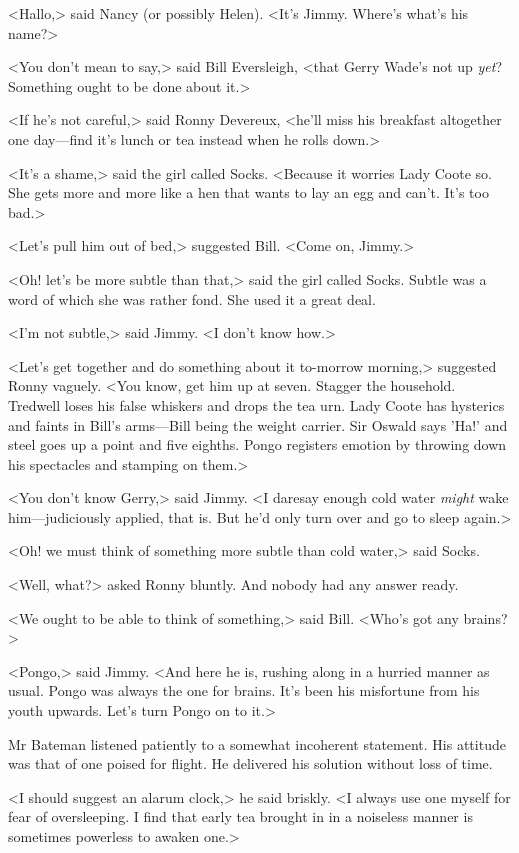<Hallo,> said Nancy (or possibly Helen). <It's Jimmy. Where's what's his name?>

<You don't mean to say,> said Bill Eversleigh, <that Gerry Wade's not up \emph{yet}? Something ought to be done about it.>

<If he's not careful,> said Ronny Devereux, <he'll miss his breakfast altogether one day—find it's lunch or tea instead when he rolls down.>

<It's a shame,> said the girl called Socks. <Because it worries Lady Coote so. She gets more and more like a hen that wants to lay an egg and can't. It's too bad.>

<Let's pull him out of bed,> suggested Bill. <Come on, Jimmy.>

<Oh! let's be more subtle than that,> said the girl called Socks. Subtle was a word of which she was rather fond. She used it a great deal.

<I'm not subtle,> said Jimmy. <I don't know how.>

<Let's get together and do something about it to-morrow morning,> suggested Ronny vaguely. <You know, get him up at seven. Stagger the household. Tredwell loses his false whiskers and drops the tea urn. Lady Coote has hysterics and faints in Bill's arms—Bill being the weight carrier. Sir Oswald says 'Ha!' and steel goes up a point and five eighths. Pongo registers emotion by throwing down his spectacles and stamping on them.>

<You don't know Gerry,> said Jimmy. <I daresay enough cold water \emph{might} wake him—judiciously applied, that is. But he'd only turn over and go to sleep again.>

<Oh! we must think of something more subtle than cold water,> said Socks.

<Well, what?> asked Ronny bluntly. And nobody had any answer ready.

<We ought to be able to think of something,> said Bill. <Who's got any brains?>

<Pongo,> said Jimmy. <And here he is, rushing along in a hurried manner as usual. Pongo was always the one for brains. It's been his misfortune from his youth upwards. Let's turn Pongo on to it.>

Mr Bateman listened patiently to a somewhat incoherent statement. His attitude was that of one poised for flight. He delivered his solution without loss of time.

<I should suggest an alarum clock,> he said briskly. <I always use one myself for fear of oversleeping. I find that early tea brought in in a noiseless manner is sometimes powerless to awaken one.>

